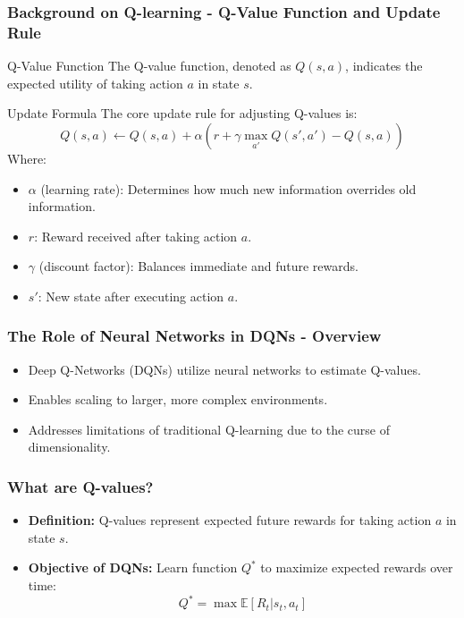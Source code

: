 \documentclass[aspectratio=169]{beamer}
\begin{document}
\begin{frame}[fragile]
    \frametitle{Background on Q-learning - Q-Value Function and Update Rule}
    \begin{block}{Q-Value Function}
        The Q-value function, denoted as \( Q(s, a) \), indicates the expected utility of taking action \( a \) in state \( s \).
    \end{block}
    
    \begin{block}{Update Formula}
        The core update rule for adjusting Q-values is:
        \[
        Q(s, a) \leftarrow Q(s, a) + \alpha \left( r + \gamma \max_{a'} Q(s', a') - Q(s, a) \right)
        \]
        Where:
        \begin{itemize}
            \item \( \alpha \) (learning rate): Determines how much new information overrides old information.
            \item \( r \): Reward received after taking action \( a \).
            \item \( \gamma \) (discount factor): Balances immediate and future rewards.
            \item \( s' \): New state after executing action \( a \).
        \end{itemize}
    \end{block}
\end{frame}

\begin{frame}[fragile]
    \frametitle{The Role of Neural Networks in DQNs - Overview}
    \begin{itemize}
        \item Deep Q-Networks (DQNs) utilize neural networks to estimate Q-values.
        \item Enables scaling to larger, more complex environments.
        \item Addresses limitations of traditional Q-learning due to the curse of dimensionality.
    \end{itemize}
\end{frame}

\begin{frame}[fragile]
    \frametitle{What are Q-values?}
    \begin{itemize}
        \item \textbf{Definition:} Q-values represent expected future rewards for taking action \( a \) in state \( s \).
        \item \textbf{Objective of DQNs:} Learn function \( Q^* \) to maximize expected rewards over time:
        \begin{equation}
            Q^* = \max \mathbb{E}[R_t | s_t, a_t]
        \end{equation}
    \end{itemize}
\end{frame}
\end{document}
